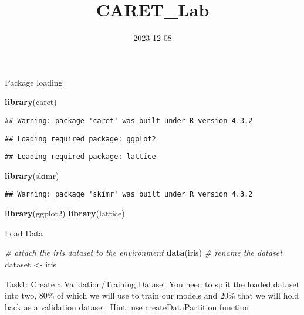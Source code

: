 \documentclass[
]{article}
\title{CARET\_Lab}
\author{}
\date{\vspace{-2.5em}2023-12-08}
\newenvironment{Shaded}{\begin{snugshade}}{\end{snugshade}}
\newcommand{\CommentTok}[1]{\textcolor[rgb]{0.56,0.35,0.01}{\textit{#1}}}
\newcommand{\FunctionTok}[1]{\textcolor[rgb]{0.13,0.29,0.53}{\textbf{#1}}}
\newcommand{\NormalTok}[1]{#1}
\newcommand{\OtherTok}[1]{\textcolor[rgb]{0.56,0.35,0.01}{#1}}
\begin{document}
\maketitle

Package loading

\begin{Shaded}
\begin{Highlighting}[]
\FunctionTok{library}\NormalTok{(caret)}
\end{Highlighting}
\end{Shaded}

\begin{verbatim}
## Warning: package 'caret' was built under R version 4.3.2
\end{verbatim}

\begin{verbatim}
## Loading required package: ggplot2
\end{verbatim}

\begin{verbatim}
## Loading required package: lattice
\end{verbatim}

\begin{Shaded}
\begin{Highlighting}[]
\FunctionTok{library}\NormalTok{(skimr)}
\end{Highlighting}
\end{Shaded}

\begin{verbatim}
## Warning: package 'skimr' was built under R version 4.3.2
\end{verbatim}

\begin{Shaded}
\begin{Highlighting}[]
\FunctionTok{library}\NormalTok{(ggplot2)}
\FunctionTok{library}\NormalTok{(lattice)}
\end{Highlighting}
\end{Shaded}

Load Data

\begin{Shaded}
\begin{Highlighting}[]
\CommentTok{\# attach the iris dataset to the environment}
\FunctionTok{data}\NormalTok{(iris)}
\CommentTok{\# rename the dataset}
\NormalTok{dataset }\OtherTok{\textless{}{-}}\NormalTok{ iris}
\end{Highlighting}
\end{Shaded}

Task1: Create a Validation/Training Dataset You need to split the loaded
dataset into two, 80\% of which we will use to train our models and 20\%
that we will hold back as a validation dataset. Hint: use
createDataPartition function
\end{document}
